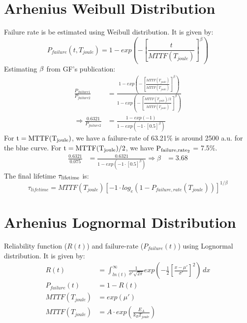 \documentclass{article}
\begin{document}
\section{Arhenius Weibull Distribution}
Failure rate is be estimated using Weibull distribution. It is given by:
\begin{equation}
P_{failure}(t, T_{joule})=1-exp(-[\frac{t}{MTTF(T_{joule})}]^{\beta})
\end{equation}
Estimating $\rm{\beta}$ from GF's publication:
\begin{equation}
\begin{aligned}
\frac{P_{failure1}}{P_{failure2}} & = 
\frac{1-exp(-[\frac{MTTF(T_{joule})}{MTTF(T_{joule})}]^{\beta})}{1-exp(-[\frac{MTTF(T_{joule})/2}{MTTF(T_{joule})}]^{\beta})}\\
\Rightarrow \frac{0.6321}{P_{failure2}} & = \frac{1-exp(-1)}{1-exp(-1 \cdot [0.5]^{\beta})}
\end{aligned}
\label{Eg:betaestimation}
\end{equation}
For  $\rm{t = MTTF(T_{joule})}$, we have a failure-rate of 63.21$\%$ is  around 2500 a.u. for the blue curve. For  $\rm{t = MTTF(T_{joule})/2}$, we have $\rm{P_{failure, rate_2}}$ = 7.5$\%$. 
\begin{equation}
\begin{aligned}
\frac{0.6321}{0.075} &=\frac{0.6321}{1-exp(-1 \cdot[0.5]^{\beta})} 
\Rightarrow \beta &= 3.68
\end{aligned}
\end{equation}
The final lifetime $\rm{\tau_{lifetime}}$ is:
\begin{equation}
\tau_{lifetime} = MTTF(T_{joule})[-1 \cdot log_{e}(1 - P_{failure, rate}(T_{joule}))]^{1/\beta}
\end{equation}

\section{Arhenius Lognormal Distribution}
Reliability function ($R(t)$) and failure-rate ($P_{failure}(t)$) using Lognormal distribution. It is given by:
\begin{equation}
\begin{aligned}
R (t) & = \int_{ln(t)}^{\infty} \frac{1}{\sigma' \sqrt{2\pi}}exp(-\frac{1}{2} [\frac{x-\mu'}{\sigma'}]^2) \, dx  \\
P_{failure}(t) & = 1-R(t)\\
MTTF(T_{joule}) &= exp(\mu') \\
MTTF(T_{joule}) &= A \cdot exp(\frac{E_A}{k_B T_{joule}})
\end{aligned}
\end{equation}
\end{document}
